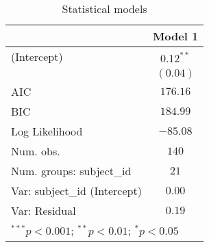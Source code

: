 
\begin{table}
\begin{center}
\begin{tabular}{l c}
\hline
 & Model 1 \\
\hline
(Intercept)                  & $0.12^{**}$ \\
                             & $(0.04)$    \\
\hline
AIC                          & $176.16$    \\
BIC                          & $184.99$    \\
Log Likelihood               & $-85.08$    \\
Num. obs.                    & $140$       \\
Num. groups: subject\_id     & $21$        \\
Var: subject\_id (Intercept) & $0.00$      \\
Var: Residual                & $0.19$      \\
\hline
\multicolumn{2}{l}{\scriptsize{$^{***}p<0.001$; $^{**}p<0.01$; $^{*}p<0.05$}}
\end{tabular}
\caption{Statistical models}
\label{table:coefficients}
\end{center}
\end{table}

